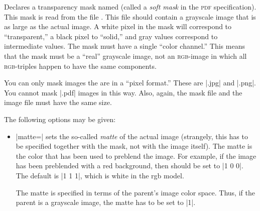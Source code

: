 \begin{command}{\pgfdeclaremask{}}
  Declares a transparency mask named  (called a
  \emph{soft mask} in the \textsc{pdf} specification). This mask is
  read from the file . This file should contain a
  grayscale image that is as large as the actual image. A white
  pixel in the mask will correspond to ``transparent,'' a black pixel
  to ``solid,'' and gray values correspond to intermediate values. The
  mask must have a single ``color channel.'' This means that the
  mask must be a ``real'' grayscale image, not an \textsc{rgb}-image
  in which all \textsc{rgb}-triples happen to have the same
  components.

  You can only mask images the are in a ``pixel format.'' These are
  |.jpg| and |.png|.  You cannot mask |.pdf| images in this way. Also,
  again, the mask file and the image file must have the same size.

  The following options may be given:
  \begin{itemize}
  \item |matte=| sets the so-called
    \emph{matte} of the actual image (strangely, this has to be
    specified together with the mask, not with the image itself). The
    matte is the color that has been used to preblend the image. For
    example, if the image has been preblended with a red background,
    then  should be set to |{1 0 0}|. The
    default is |{1 1 1}|, which is white in the rgb model.

    The matte is specified in terms of the parent's image color
    space. Thus, if the parent is a grayscale image, the matte has to
    be set to |{1}|.
  \end{itemize}
  \example
\begin{codeexample}[]
\hbox{\hskip-14cm\hskip1cm
\hskip1cm
\hskip1cm
}
\end{codeexample}
\end{command}


